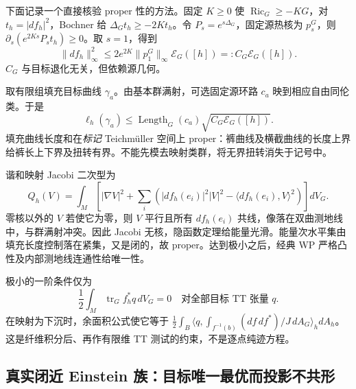 \documentclass[UTF8,fontset=fandol,zihao=-4,oneside,openany]{ctexbook}
\theoremstyle{cjkplain}
\numberwithin{equation}{chapter}
\begin{document}
下面记录一个直接核验 proper 性的方法。固定 $K\ge0$ 使 $\operatorname{Ric}_G\ge-KG$，对 $t_h=|df_h|^2$，Bochner 给
$\Delta_Gt_h\ge-2Kt_h$。令 $P_s=e^{s\Delta_G}$，固定源热核为 $p_s^G$，则
$\partial_s(e^{2Ks}P_st_h)\ge0$。取 $s=1$，得到
\begin{equation}\label{SUB:heat-kernel-gradient}
\|df_h\|_\infty^2
\le2e^{2K}\|p_1^G\|_\infty\mathcal E_G([h])=:C_G\mathcal E_G([h]).
\end{equation}
$C_G$ 与目标退化无关，但依赖源几何。

取有限组填充目标曲线 $\gamma_a$。由基本群满射，可选固定源环路 $c_a$ 映到相应自由同伦类。于是
\[
\ell_h(\gamma_a)\le\operatorname{Length}_G(c_a)\sqrt{C_G\mathcal E_G([h])}.
\]
填充曲线长度和在\emph{标记} Teichmüller 空间上 proper：裤曲线及横截曲线的长度上界给裤长上下界及扭转有界。不能先模去映射类群，将无界扭转消失于记号中。

谐和映射 Jacobi 二次型为
\[
Q_h(V)=\int_M\left[|\nabla V|^2+
\sum_i(|df_h(e_i)|^2|V|^2-\langle df_h(e_i),V\rangle^2)\right]dV_G.
\]
零核以外的 $V$ 若使它为零，则 $V$ 平行且所有 $df_h(e_i)$ 共线，像落在双曲测地线中，与群满射冲突。因此 Jacobi 无核，隐函数定理给能量光滑。能量次水平集由填充长度控制落在紧集，又是闭的，故 proper。达到极小之后，经典 WP 严格凸性及内部测地线连通性给唯一性。

极小的一阶条件仅为
\begin{equation}\label{SUB:target-stationary}
\frac12\int_M\operatorname{tr}_G f_h^*q\,dV_G=0
\quad\text{对全部目标 TT 张量 }q.
\end{equation}
在映射为下沉时，余面积公式使它等于
$\tfrac12\int_B\langle q,\int_{f^{-1}(b)}(df\,df^*)/J\,dA_G\rangle_h dA_h$。
这是纤维积分后、再作有限维 TT 测试的约束，不是逐点纯迹方程。

\subsection{真实闭近 Einstein 族：目标唯一最优而投影不共形}
\end{document}
